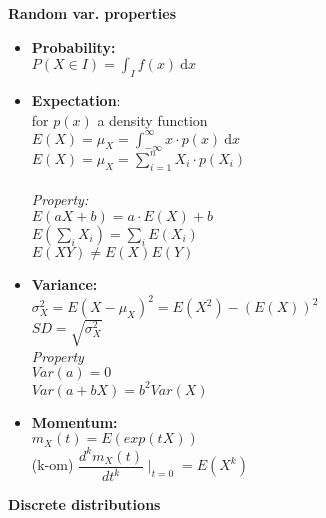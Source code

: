 \documentclass[a4paper, 10pt, landscape]{article}
\begin{document}
\begin{multicols*}{4}
\textbf{\footnotesize Random var. properties}

\begin{itemize}
\item{\textbf{Probability:} \\ $P(X\in I) = \displaystyle{\int_I f(x) ~\textrm{d}x}$}
\item{\textbf{Expectation}: \\for $p(x)$ a density function \\ \textbullet $E(X) = \mu _X = \displaystyle{\int_{-\infty}^{\infty}} x \cdot p(x) ~\textrm{d}x$ \\ \textbullet $E(X) = \mu _X = \displaystyle{\sum_{i=1}^{n} X_i \cdot  p\left( X_i \right)}$ \\ \\ \textit{Property:} \\ \textbullet $E(aX + b) = a \cdot E(X) + b$ \\ \textbullet $E \displaystyle{\left(  \sum_i X_i\right) = \sum_i E\left( X_i \right) }$ \\ \textbullet $E(XY)\neq E(X)E(Y)$}
\item{\textbf{Variance:} \\ $\sigma^2_X = E(X-\mu_X)^2 = E(X^2) - (E(X))^2$ \\ $SD=\sqrt{\sigma^2_X}$ \\ \textit{Property} \\ \textbullet $Var(a) =0$ \\ \textbullet $Var(a+bX)=b^2 Var(X)$}
\item{\textbf{Momentum:} \\ $m_X(t) = E(exp(tX))$ \\ (k-om) $\displaystyle{\dfrac{d^k m_X(t)}{dt^k}\mid_{t=0} = E(X^k)  }$}
\end{itemize}

\textbf{\footnotesize Discrete distributions}


\end{multicols*}
\end{document}
